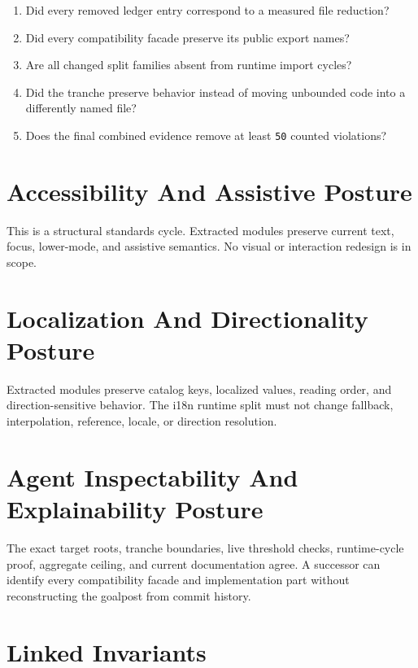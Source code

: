 \begin{enumerate}
\def\labelenumi{\arabic{enumi}.}
\tightlist
\item
  Did every removed ledger entry correspond to a measured file reduction?
\item
  Did every compatibility facade preserve its public export names?
\item
  Are all changed split families absent from runtime import cycles?
\item
  Did the tranche preserve behavior instead of moving unbounded code into a differently named file?
\item
  Does the final combined evidence remove at least \texttt{5\allowbreak{}0} counted violations?
\end{enumerate}

\section{Accessibility And Assistive Posture}\label{record-247-accessibility-and-assistive-posture}

This is a structural standards cycle. Extracted modules preserve current text, focus, lower-mode, and assistive semantics. No visual or interaction redesign is in scope.

\section{Localization And Directionality Posture}\label{record-247-localization-and-directionality-posture}

Extracted modules preserve catalog keys, localized values, reading order, and direction-sensitive behavior. The i18n runtime split must not change fallback, interpolation, reference, locale, or direction resolution.

\section{Agent Inspectability And Explainability Posture}\label{record-247-agent-inspectability-and-explainability-posture}

The exact target roots, tranche boundaries, live threshold checks, runtime-cycle proof, aggregate ceiling, and current documentation agree. A successor can identify every compatibility facade and implementation part without reconstructing the goalpost from commit history.

\section{Linked Invariants}\label{record-247-linked-invariants}

